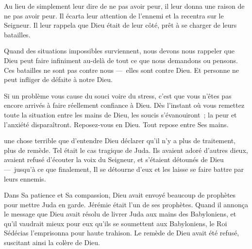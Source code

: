 Au lieu de simplement leur dire de ne pas avoir peur,
 il leur donna une raison de ne pas avoir peur.
 Il écarta leur attention de l'ennemi et la recentra sur le Seigneur.
 Il leur rappela que Dieu était de leur côté,
 prêt à se charger de leurs batailles.


Quand des situations impossibles surviennent,
 nous devons nous rappeler que Dieu peut faire infiniment au-delà
 de tout ce que nous demandons ou pensons.
 Ces batailles ne sont pas contre nous ---~elles sont contre Dieu.
 Et personne ne peut infliger de défaite à notre Dieu.

Si un problème vous cause du souci voire du stress,
 c'est que vous n'êtes pas encore arrivés à faire réellement
 confiance à Dieu.
 Dès l'instant où vous remettez toute la situation entre les mains de Dieu,
 les soucis s'évanouiront~; la peur et l'anxiété disparaîtront.
 Reposez-vous en Dieu. Tout repose entre Ses mains. 

\dvrule







 une chose terrible que d'entendre Dieu déclarer
 qu'il n'y a plus de traitement, plus de remède.
 Tel était le cas tragique de Juda.
 Ils avaient adoré d'autres dieux, avaient refusé d'écouter
 la voix du Seigneur, et s'étaient détounés de Dieu
 ---~jusqu'à ce que finalement, Il se détourne d'eux
 et les laisse se faire battre par leurs ennemis. 


Dans Sa patience et Sa compassion, Dieu avait envoyé beaucoup de prophètes
 pour mettre Juda en garde.
 Jérémie était l'un de ses prophètes.
 Quand il annonça le message que Dieu avait résolu de livrer Juda
 aux mains des Babyloniens,
 et qu'il vaudrait mieux pour eux qu'ils se soumettent aux Babyloniens,
 le Roi Sédécias l'emprisonna pour haute trahison.
 Le remède de Dieu avait été refusé, suscitant ainsi la colère de Dieu.


